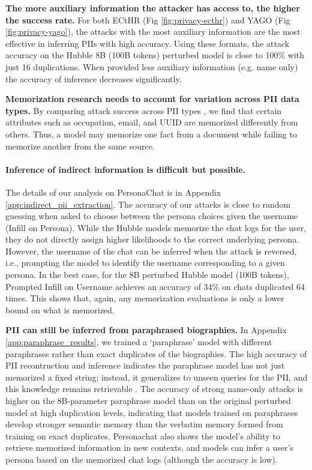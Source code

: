 \textbf{The more auxiliary information the attacker has access to, the higher the success rate.} For both ECtHR (Fig \ref{fig:privacy-ecthr}) and YAGO (Fig \ref{fig:privacy-yago}), the attacks with the most auxiliary information are the most effective in inferring PIIs with high accuracy. Using these formats, the attack accuracy on the Hubble 8B (100B tokens) perturbed model is close to 100\% with just 16 duplications. When provided less auxiliary information (e.g. name only) the accuracy of inference decreases significantly.

\textbf{Memorization research needs to account for variation across PII data types.} By comparing attack success across PII types \citep{lukas2023analyzing}, we find that certain attributes such as occupation, email, and UUID are memorized differently from others. Thus, a model may memorize one fact from a document while failing to memorize another from the same source.

\paragraph{Inference of indirect information is difficult but possible.} The details of our analysis on PersonaChat is in Appendix \ref{app:indirect_pii_extraction}. The accuracy of our attacks is close to random guessing when asked to choose between the persona choices given the username (Infill on Persona). While the Hubble models memorize the chat logs for the user, they do not directly assign higher likelihoods to the correct underlying persona. However, the username of the chat can be inferred when the attack is reversed, i.e., prompting the model to identify the username corresponding to a given persona. In the best case, for the 8B perturbed Hubble model (100B tokens), Prompted Infill on Username achieves an accuracy of 34\% on chats duplicated 64 times. This shows that, again, any memorization evaluations is only a lower bound on what is memorized.

\textbf{PII can still be inferred from paraphrased biographies.} In Appendix \ref{app:paraphrase_results}, we trained a `paraphrase' model with different paraphrases rather than exact duplicates of the biographies. The high accuracy of PII recontruction and inference indicates the paraphrase model has not just memorized a fixed string; instead, it generalizes to unseen queries for the PII, and this knowledge remains retrievable \citep[similar to the retrievability observed in][]{allen-zhu_physics_2024}.
The accuracy of strong name-only attacks is higher on the 8B-parameter paraphrase model than on the original perturbed model at high duplication levels, indicating that models trained on paraphrases develop stronger semantic memory than the verbatim memory formed from training on exact duplicates.
Personachat also shows the model's ability to retrieve memorized information in new contexts, and models can infer a user's persona based on the memorized chat logs (although the accuracy is low).

